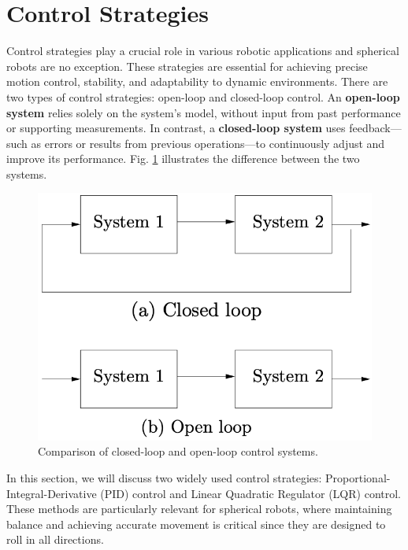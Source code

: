 \documentclass[english, bachelor, utf8]{base/thesis_telematics}
\begin{document}
\section{Control Strategies}
\label{sec:control-strategies}
Control strategies play a crucial role in various robotic applications and spherical robots are no exception.
These strategies are essential for achieving precise motion control, stability, and adaptability to dynamic environments.
There are two types of control strategies: open-loop and closed-loop control.
An \textbf{open-loop system} relies solely on the system's model, without input from past performance or supporting measurements. In contrast, a \textbf{closed-loop system} uses feedback---such as errors or results from previous operations---to continuously adjust and improve its performance. Fig. \ref{fig:control_systems} illustrates the difference between the two systems.\cite{feedbackBook,vectornav_math_controls}

\begin{figure}[ht]
\centering
\includegraphics[width=0.4\columnwidth]{pics/systems.png}
\caption{Comparison of closed-loop and open-loop control systems.\cite{feedbackBook}}
\label{fig:control_systems}
\end{figure}

In this section, we will discuss two widely used control strategies: Proportional-Integral-Derivative (PID) control and Linear Quadratic Regulator (LQR) control.
These methods are particularly relevant for spherical robots, where maintaining balance and achieving accurate movement is critical since they are designed to roll in all directions.
\end{document}
